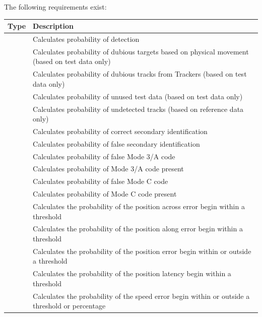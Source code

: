 The following requirements exist:

\begin{center}
 \begin{table}[H]
  \begin{tabularx}{\textwidth}{ | l | X |  }
    \hline
    \textbf{Type} & \textbf{Description} \\ \hline
    \nameref{sec:eval_req_detection} & Calculates probability of detection  \\ \hline
    \nameref{sec:eval_req_dubious_targets} & Calculates probability of dubious targets based on physical movement (based on test data only) \\ \hline
    \nameref{sec:eval_req_dubious_tracks} & Calculates probability of dubious tracks from Trackers (based on test data only) \\ \hline
    \nameref{sec:eval_req_extra_data} & Calculates probability of unused test data (based on test data only) \\ \hline
    \nameref{sec:eval_req_extra_track} & Calculates probability of undetected tracks (based on reference data only) \\ \hline
    \nameref{sec:eval_req_id_correct} & Calculates probability of correct secondary identification \\ \hline
    \nameref{sec:eval_req_id_false} & Calculates probability of false secondary identification \\ \hline
    \nameref{sec:eval_req_m3a_false} & Calculates probability of false Mode 3/A code \\ \hline
    \nameref{sec:eval_req_m3a_present} & Calculates probability of Mode 3/A code present \\ \hline
    \nameref{sec:eval_req_mc_false} & Calculates probability of false Mode C code \\ \hline
    \nameref{sec:eval_req_mc_present} & Calculates probability of Mode C code present \\ \hline
    \nameref{sec:eval_req_pos_across} & Calculates the probability of the position across error begin within a threshold \\ \hline
    \nameref{sec:eval_req_pos_along} & Calculates the probability of the position along error begin within a threshold \\ \hline
    \nameref{sec:eval_req_pos_distance} & Calculates the probability of the position error begin within or outside a threshold \\ \hline
    \nameref{sec:eval_req_pos_latency}  & Calculates the probability of the position latency begin within a threshold \\ \hline
    \nameref{sec:eval_req_speed} & Calculates the probability of the speed error begin within or outside a threshold or percentage \\ \hline
\end{tabularx}
\end{table}
\end{center}
\ \\


